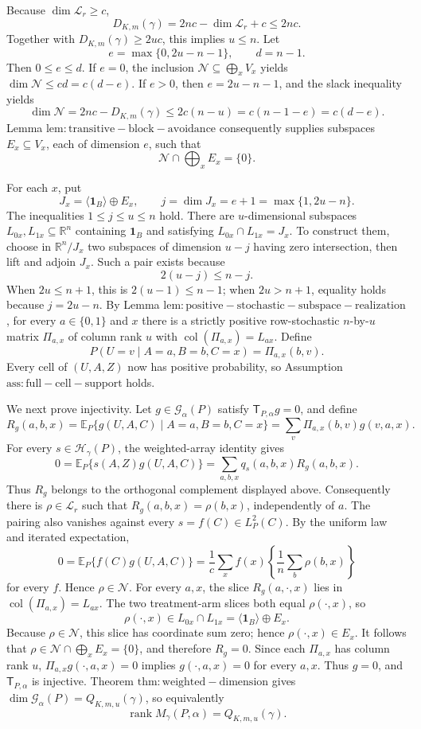 Because \(\dim\mathcal L_r\ge c\),
\[D_{K,m}(\gamma)=2nc-\dim\mathcal L_r+c\le2nc.\]
Together with \(D_{K,m}(\gamma)\ge2uc\), this implies \(u\le n\). Let
\[e=\max\{0,2u-n-1\},\qquad d=n-1.\]
Then \(0\le e\le d\). If \(e=0\), the inclusion \(\mathcal N\subseteq\bigoplus_xV_x\) yields \(\dim\mathcal N\le cd=c(d-e)\). If \(e>0\), then \(e=2u-n-1\), and the slack inequality yields
\[\dim\mathcal N=2nc-D_{K,m}(\gamma)\le2c(n-u)=c(n-1-e)=c(d-e).\]
Lemma \(\mathrm{lem:transitive-block-avoidance}\) consequently supplies subspaces \(E_x\subseteq V_x\), each of dimension \(e\), such that
\[\mathcal N\cap\bigoplus_xE_x=\{0\}.\]

For each \(x\), put
\[J_x=\langle\mathbf 1_B\rangle\oplus E_x,\qquad j=\dim J_x=e+1=\max\{1,2u-n\}.\]
The inequalities \(1\le j\le u\le n\) hold. There are \(u\)-dimensional subspaces \(L_{0x},L_{1x}\subseteq\mathbb R^n\) containing \(\mathbf 1_B\) and satisfying \(L_{0x}\cap L_{1x}=J_x\). To construct them, choose in \(\mathbb R^n/J_x\) two subspaces of dimension \(u-j\) having zero intersection, then lift and adjoin \(J_x\). Such a pair exists because
\[2(u-j)\le n-j.\]
When \(2u\le n+1\), this is \(2(u-1)\le n-1\); when \(2u>n+1\), equality holds because \(j=2u-n\). By Lemma \(\mathrm{lem:positive-stochastic-subspace-realization}\), for every \(a\in\{0,1\}\) and \(x\) there is a strictly positive row-stochastic \(n\)-by-\(u\) matrix \(\Pi_{a,x}\) of column rank \(u\) with \(\operatorname{col}(\Pi_{a,x})=L_{ax}\). Define
\[P(U=v\mid A=a,B=b,C=x)=\Pi_{a,x}(b,v).\]
Every cell of \((U,A,Z)\) now has positive probability, so Assumption \(\mathrm{ass:full-cell-support}\) holds.

We next prove injectivity. Let \(g\in\mathcal G_\alpha(P)\) satisfy \(\mathsf T_{P,\alpha}g=0\), and define
\[R_g(a,b,x)=\mathbb E_P\{g(U,A,C)\mid A=a,B=b,C=x\}=\sum_v\Pi_{a,x}(b,v)g(v,a,x).\]
For every \(s\in\mathcal H_\gamma(P)\), the weighted-array identity gives
\[0=\mathbb E_P\{s(A,Z)g(U,A,C)\}=\sum_{a,b,x}q_s(a,b,x)R_g(a,b,x).\]
Thus \(R_g\) belongs to the orthogonal complement displayed above. Consequently there is \(\rho\in\mathcal L_r\) such that \(R_g(a,b,x)=\rho(b,x)\), independently of \(a\). The pairing also vanishes against every \(s=f(C)\in L_P^2(C)\). By the uniform law and iterated expectation,
\[0=\mathbb E_P\{f(C)g(U,A,C)\}=\frac1c\sum_x f(x)\left\{\frac1n\sum_b\rho(b,x)\right\}\]
for every \(f\). Hence \(\rho\in\mathcal N\). For every \(a,x\), the slice \(R_g(a,\cdot,x)\) lies in \(\operatorname{col}(\Pi_{a,x})=L_{ax}\). The two treatment-arm slices both equal \(\rho(\cdot,x)\), so
\[\rho(\cdot,x)\in L_{0x}\cap L_{1x}=\langle\mathbf1_B\rangle\oplus E_x.\]
Because \(\rho\in\mathcal N\), this slice has coordinate sum zero; hence \(\rho(\cdot,x)\in E_x\). It follows that \(\rho\in\mathcal N\cap\bigoplus_xE_x=\{0\}\), and therefore \(R_g=0\). Since each \(\Pi_{a,x}\) has column rank \(u\), \(\Pi_{a,x}g(\cdot,a,x)=0\) implies \(g(\cdot,a,x)=0\) for every \(a,x\). Thus \(g=0\), and \(\mathsf T_{P,\alpha}\) is injective. Theorem \(\mathrm{thm:weighted-dimension}\) gives \(\dim\mathcal G_\alpha(P)=Q_{K,m,u}(\gamma)\), so equivalently
\[\operatorname{rank}M_\gamma(P,\alpha)=Q_{K,m,u}(\gamma).\]

